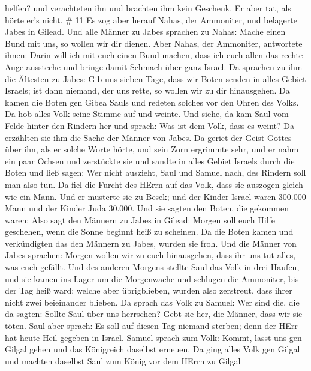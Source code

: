 helfen? und verachteten ihn und brachten ihm kein Geschenk. Er aber tat,
als hörte er's nicht. \# 11  Es zog aber herauf Nahas, der
Ammoniter, und belagerte Jabes in Gilead. Und alle Männer zu Jabes
sprachen zu Nahas: Mache einen Bund mit uns, so wollen wir dir dienen.
 Aber Nahas, der Ammoniter, antwortete ihnen: Darin will ich
mit euch einen Bund machen, dass ich euch allen das rechte Auge
aussteche und bringe damit Schmach über ganz Israel.  Da
sprachen zu ihm die Ältesten zu Jabes: Gib uns sieben Tage, dass wir
Boten senden in alles Gebiet Israels; ist dann niemand, der uns rette,
so wollen wir zu dir hinausgehen.  Da kamen die Boten gen
Gibea Sauls und redeten solches vor den Ohren des Volks. Da hob alles
Volk seine Stimme auf und weinte.  Und siehe, da kam Saul
vom Felde hinter den Rindern her und sprach: Was ist dem Volk, dass es
weint? Da erzählten sie ihm die Sache der Männer von Jabes. 
Da geriet der Geist Gottes über ihn, als er solche Worte hörte, und sein
Zorn ergrimmte sehr,  und er nahm ein paar Ochsen und
zerstückte sie und sandte in alles Gebiet Israels durch die Boten und
ließ sagen: Wer nicht auszieht, Saul und Samuel nach, des Rindern soll
man also tun. Da fiel die Furcht des HErrn auf das Volk, dass sie
auszogen gleich wie ein Mann.  Und er musterte sie zu Besek;
und der Kinder Israel waren 300.000 Mann und der Kinder Juda 30.000.
 Und sie sagten den Boten, die gekommen waren: Also sagt den
Männern zu Jabes in Gilead: Morgen soll euch Hilfe geschehen, wenn die
Sonne beginnt heiß zu scheinen. Da die Boten kamen und verkündigten das
den Männern zu Jabes, wurden sie froh.  Und die Männer von
Jabes sprachen: Morgen wollen wir zu euch hinausgehen, dass ihr uns tut
alles, was euch gefällt.  Und des anderen Morgens stellte
Saul das Volk in drei Haufen, und sie kamen ins Lager um die Morgenwache
und schlugen die Ammoniter, bis der Tag heiß ward; welche aber
übrigblieben, wurden also zerstreut, dass ihrer nicht zwei beieinander
blieben.  Da sprach das Volk zu Samuel: Wer sind die, die
da sagten: Sollte Saul über uns herrschen? Gebt sie her, die Männer,
dass wir sie töten.  Saul aber sprach: Es soll auf diesen
Tag niemand sterben; denn der HErr hat heute Heil gegeben in Israel.
 Samuel sprach zum Volk: Kommt, lasst uns gen Gilgal gehen
und das Königreich daselbst erneuen.  Da ging alles Volk
gen Gilgal und machten daselbst Saul zum König vor dem HErrn zu Gilgal
